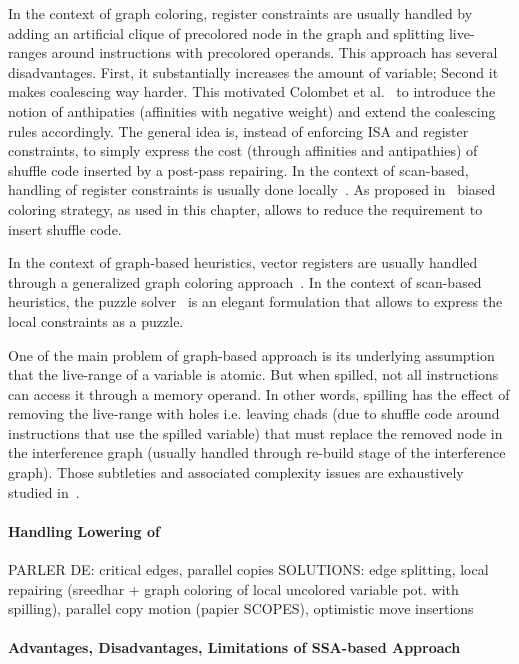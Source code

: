 {In the context of graph coloring, register constraints are usually handled by adding an artificial clique of precolored node in the graph and splitting live-ranges around instructions with precolored operands.
This approach has several disadvantages.
First, it substantially increases the amount of variable;
Second it makes coalescing way harder.
This motivated Colombet et al.~\cite{ColombetOct11} to introduce the notion of anthipaties (affinities with negative weight) and extend the coalescing rules accordingly.
The general idea is, instead of enforcing ISA and register constraints, to simply express the cost (through affinities and antipathies) of shuffle code inserted by a post-pass repairing.
In the context of scan-based, handling of register constraints is usually done locally~\cite{linear-pfeifer,sarkar2007extended}.
As proposed in~\cite{braun2010preference,ColombetOct11} biased coloring strategy, as used in this chapter, allows to reduce the requirement to insert shuffle code.

In the context of graph-based heuristics, vector registers are usually handled through a generalized graph coloring approach~\cite{Smith04,Tavares}.
In the context of scan-based heuristics, the puzzle solver~\cite{Pereira:2008:PLDI} is an elegant formulation that allows to express the local constraints as a puzzle. 

One of the main problem of graph-based approach is its underlying assumption that the live-range of a variable is atomic.
But when spilled, not all instructions can access it through a memory operand.
In other words, spilling has the effect of removing the live-range with holes i.e. leaving chads (due to shuffle code around instructions that use the spilled variable) that must replace the removed node in the interference graph (usually handled through re-build stage of the interference graph).
Those subtleties and associated complexity issues are exhaustively studied in~\cite{Bouchez07b}. 

\paragraph{Handling Lowering of \phifun}
PARLER DE: critical edges, parallel copies
SOLUTIONS: edge splitting, local repairing (sreedhar + graph coloring of local uncolored variable pot. with spilling), parallel copy motion (papier SCOPES), optimistic move insertions~\cite{braun2010preference}

\paragraph{Advantages, Disadvantages, Limitations of SSA-based Approach}


}
